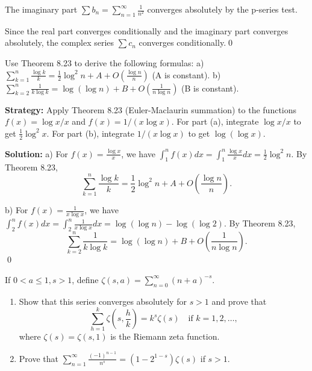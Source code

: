 The imaginary part \(\sum b_n = \sum_{n=1}^{\infty} \frac{1}{n^2}\) converges absolutely by the p-series test.

Since the real part converges conditionally and the imaginary part converges absolutely, the complex series \(\sum c_n\) converges conditionally.\qed



\begin{problembox}
Use Theorem 8.23 to derive the following formulas:
a) \(\sum_{k=1}^{n} \frac{\log k}{k} = \frac{1}{2} \log^2 n + A + O \left( \frac{\log n}{n} \right)\) (A is constant).
b) \(\sum_{k=2}^{n} \frac{1}{k \log k} = \log (\log n) + B + O \left( \frac{1}{n \log n} \right)\) (B is constant).
\end{problembox}

\noindent\textbf{Strategy:} Apply Theorem 8.23 (Euler-Maclaurin summation) to the functions \(f(x)=\log x/x\) and \(f(x)=1/(x\log x)\). For part (a), integrate \(\log x/x\) to get \(\frac{1}{2}\log^2 x\). For part (b), integrate \(1/(x\log x)\) to get \(\log(\log x)\).

\bigskip\noindent\textbf{Solution:}
a) For \(f(x) = \frac{\log x}{x}\), we have \(\int_1^n f(x) dx = \int_1^n \frac{\log x}{x} dx = \frac{1}{2}\log^2 n\). By Theorem 8.23,
\[\sum_{k=1}^{n} \frac{\log k}{k} = \frac{1}{2}\log^2 n + A + O\left(\frac{\log n}{n}\right).\]

b) For \(f(x) = \frac{1}{x \log x}\), we have \(\int_2^n f(x) dx = \int_2^n \frac{1}{x \log x} dx = \log(\log n) - \log(\log 2)\). By Theorem 8.23,
\[\sum_{k=2}^{n} \frac{1}{k \log k} = \log(\log n) + B + O\left(\frac{1}{n \log n}\right).\]
\qed



\begin{problembox}
If \(0 < a \leq 1, s > 1\), define \(\zeta(s, a) = \sum_{n=0}^{\infty} (n + a)^{-s}\).
\begin{enumerate}[label=\alph*)]
\item Show that this series converges absolutely for \(s > 1\) and prove that
\[\sum_{h=1}^{k} \zeta \left( s, \frac{h}{k} \right) = k^s \zeta(s) \quad \text{if } k = 1, 2, \ldots,\]
where \(\zeta(s) = \zeta(s, 1)\) is the Riemann zeta function.
\item Prove that \(\sum_{n=1}^{\infty} \frac{(-1)^{n-1}}{n^s} = (1 - 2^{1-s}) \zeta(s)\) if \(s > 1\).
\end{enumerate}
\end{problembox}


